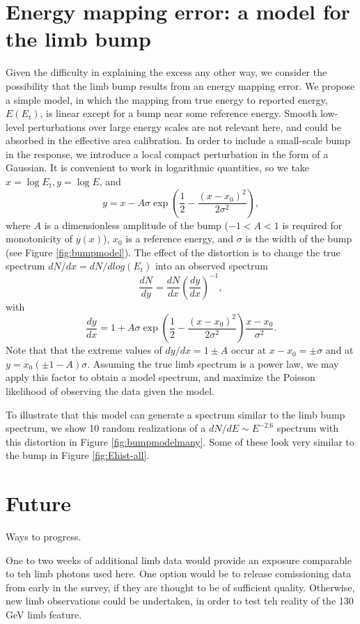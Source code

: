 \documentclass[aps,twocolumn,prd,superscriptaddress,showpacs,nofootinbib,fixfloat]{revtex4}
\newcommand{\be}{\begin{equation}}
\newcommand{\ee}{\end{equation}}
\begin{document}
\section{Energy mapping error: a model for the limb bump}
Given the difficulty in explaining the excess any other way, we consider the
possibility that the limb bump results from an energy mapping error.  We
propose a simple model, in which the mapping from true energy to reported
energy, $E(E_t)$, is linear except for a bump near some reference energy.
Smooth low-level perturbations over large energy scales are not relevant here,
and could be absorbed in the effective area calibration.  In order to include
a small-scale bump in the response, we introduce a local compact perturbation
in the form of a Gaussian.  It is convenient to work in logarithmic
quantities, so we take $x=\log E_t, y=\log E$, and
\be
\label{eq:yofx}
y=x - A\sigma \exp\left(\frac{1}{2}-\frac{(x-x_0)^2}{2\sigma^2}\right),
\ee
where $A$ is a dimensionless amplitude of the bump ($-1<A<1$ is required
for monotonicity of $y(x)$), $x_0$ is a reference energy, and $\sigma$ is the
width of the bump (see Figure \ref{fig:bumpmodel}).
The effect of the distortion is to change the true spectrum $dN/dx =
dN/dlog(E_t)$ into an observed spectrum
\be
\label{eq:dndy}
\frac{dN}{dy} = \frac{dN}{dx} \left(\frac{dy}{dx}\right)^{-1} ,
\ee
with
\be
\label{eq:dydx}
\frac{dy}{dx} = 1 + A\sigma \exp\left(\frac{1}{2}-\frac{(x-x_0)^2}{2\sigma^2}\right)
\frac{x-x_0}{\sigma^2}.
\ee
Note that that the extreme values of $dy/dx = 1 \pm A$ occur at $x-x_0 = \pm
\sigma$ and at $y=x_0(\pm1-A)\sigma$.  Assuming the true limb spectrum is a
power law, we may apply this factor to obtain a model spectrum, and maximize
the Poisson likelihood of observing the data given the model.

To illustrate that this model can generate a spectrum similar to the limb bump
spectrum, we show 10 random realizations of a $dN/dE \sim E^{-2.6}$ spectrum
with this distortion in Figure \ref{fig:bumpmodelmany}.
Some of these look very similar to the bump in Figure \ref{fig:Ehist-all}.


\section{Future}
Ways to progress.

One to two weeks of additional limb data would provide an exposure comparable
to teh limb photons used here.  One option would be to release comissioning
data from early in the survey, if they are thought to be of sufficient
quality.  Otherwise, new limb observations could be undertaken, in order to
test teh reality of the 130 GeV limb feature.  
\end{document}
